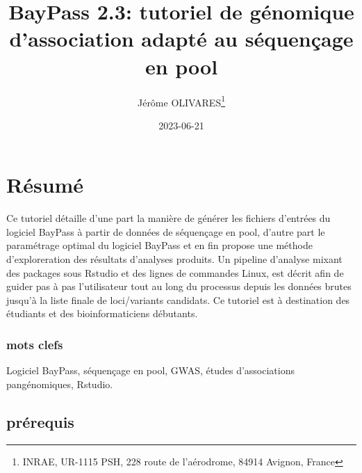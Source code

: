 \documentclass[
  openany]{book}
\title{BayPass 2.3: tutoriel de génomique d'association adapté au séquençage en pool}
\author{Jérôme OLIVARES\footnote{INRAE, UR-1115 PSH, 228 route de l'aérodrome, 84914 Avignon, France}}
\date{2023-06-21}
\begin{document}
\maketitle

{
\hypersetup{linkcolor=}
\setcounter{tocdepth}{1}
\tableofcontents
}
\hypertarget{ruxe9sumuxe9}{%
\chapter*{Résumé}\label{ruxe9sumuxe9}}

Ce tutoriel détaille d'une part la manière de générer les fichiers d'entrées du logiciel BayPass à partir de données de séquençage en pool, d'autre part le paramétrage optimal du logiciel BayPass et en fin propose une méthode d'exploreration des résultats d'analyses produits. Un pipeline d'analyse mixant des packages sous Rstudio et des lignes de commandes Linux, est décrit afin de guider pas à pas l'utilisateur tout au long du processus depuis les données brutes jusqu'à la liste finale de loci/variants candidats.
Ce tutoriel est à destination des étudiants et des bioinformaticiens débutants.

\hypertarget{mots-clefs}{%
\subsection*{mots clefs}\label{mots-clefs}}

Logiciel BayPass, séquençage en pool, GWAS, études d'associations pangénomiques, Rstudio.

\hypertarget{pruxe9requis}{%
\section*{prérequis}\label{pruxe9requis}}
\end{document}
